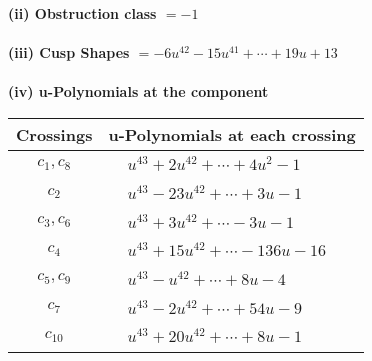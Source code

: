 \documentclass[1p]{elsarticle_modified}
\theoremstyle{definition}
\begin{document}
\flushleft \textbf{(ii) Obstruction class $= -1$}\\~\\
\flushleft \textbf{(iii) Cusp Shapes $= -6 u^{42}-15 u^{41}+\cdots+19 u+13$}\\~\\
\newpage\renewcommand{\arraystretch}{1}
\flushleft \textbf{(iv) u-Polynomials at the component}\newline \\
\begin{tabular}{m{50pt}|m{274pt}}
Crossings & \hspace{64pt}u-Polynomials at each crossing \\
\hline $$\begin{aligned}c_{1},c_{8}\end{aligned}$$&$\begin{aligned}
&u^{43}+2 u^{42}+\cdots+4 u^2-1
\end{aligned}$\\
\hline $$\begin{aligned}c_{2}\end{aligned}$$&$\begin{aligned}
&u^{43}-23 u^{42}+\cdots+3 u-1
\end{aligned}$\\
\hline $$\begin{aligned}c_{3},c_{6}\end{aligned}$$&$\begin{aligned}
&u^{43}+3 u^{42}+\cdots-3 u-1
\end{aligned}$\\
\hline $$\begin{aligned}c_{4}\end{aligned}$$&$\begin{aligned}
&u^{43}+15 u^{42}+\cdots-136 u-16
\end{aligned}$\\
\hline $$\begin{aligned}c_{5},c_{9}\end{aligned}$$&$\begin{aligned}
&u^{43}- u^{42}+\cdots+8 u-4
\end{aligned}$\\
\hline $$\begin{aligned}c_{7}\end{aligned}$$&$\begin{aligned}
&u^{43}-2 u^{42}+\cdots+54 u-9
\end{aligned}$\\
\hline $$\begin{aligned}c_{10}\end{aligned}$$&$\begin{aligned}
&u^{43}+20 u^{42}+\cdots+8 u-1
\end{aligned}$\\
\hline
\end{tabular}\\~\\
\end{document}
